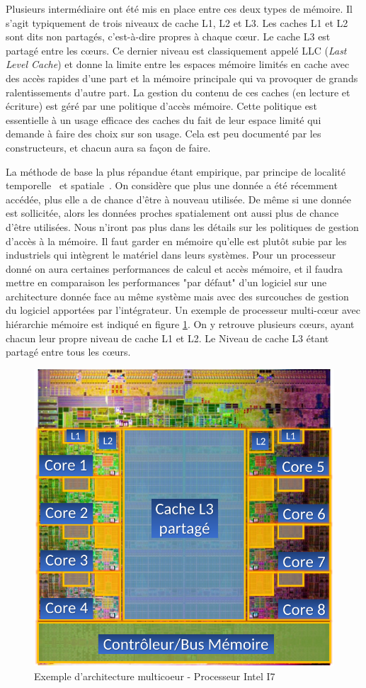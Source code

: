 Plusieurs intermédiaire ont été mis en place entre ces deux types de mémoire. Il s'agit typiquement de trois niveaux de cache L1, L2 et L3. Les caches L1 et L2 sont dits non partagés, c'est-à-dire propres à chaque c\oe{}ur. Le cache L3 est partagé entre les c\oe{}urs. Ce dernier niveau est classiquement appelé LLC (\emph{Last Level Cache}) et donne la limite entre les espaces mémoire limités en cache avec des accès rapides d'une part et la mémoire principale qui va provoquer de grands ralentissements d'autre part. La gestion du contenu de ces caches (en lecture et écriture) est géré par une politique d'accès mémoire. Cette politique est essentielle à un usage efficace des caches du fait de leur espace limité qui demande à faire des choix sur son usage. Cela est peu documenté par les constructeurs,  et chacun aura sa façon de faire. 

La méthode de base la plus répandue étant empirique, par principe de localité temporelle~\cite{durrieu2014predictable} et spatiale~\cite{wilkes1965slave}. On considère que plus une donnée a été récemment accédée, plus elle a de chance d'être à nouveau utilisée. De même si une donnée est sollicitée, alors les données proches spatialement ont aussi plus de chance d'être utilisées. 
Nous n'iront pas plus dans les détails sur les politiques de gestion d'accès à la mémoire. Il faut garder en mémoire qu'elle est plutôt subie par les industriels qui intègrent le matériel dans leurs systèmes. Pour un processeur donné on aura certaines performances de calcul et accès mémoire, et il faudra mettre en comparaison les performances "par défaut" d'un logiciel sur une architecture donnée face au même système mais avec des surcouches de gestion du logiciel apportées par l'intégrateur. Un exemple de processeur multi-c\oe{}ur avec hiérarchie mémoire est indiqué en figure \ref{fig:multicoeurintel}. On y retrouve plusieurs c\oe{}urs, ayant chacun leur propre niveau de cache L1 et L2. Le Niveau de cache L3 étant partagé entre tous les c\oe{}urs. 
\begin{figure}
	\centering
	\includegraphics[width=0.5\linewidth]{schemas/multicoeurIntel}
	\caption[multicoeur]{Exemple d'architecture multicoeur - Processeur Intel I7}
	\label{fig:multicoeurintel}
\end{figure}



